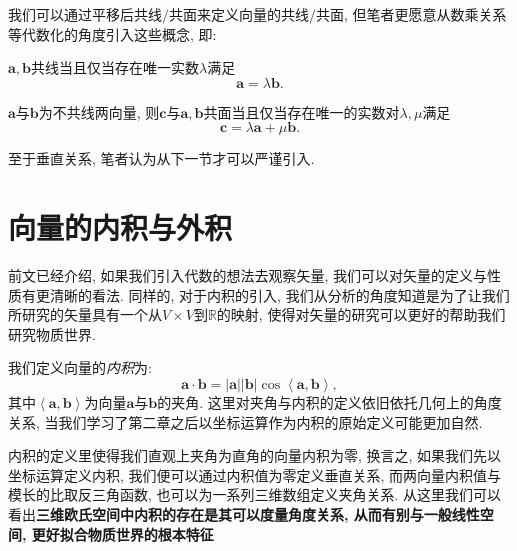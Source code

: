 \documentclass[./main.tex]{subfiles}
\begin{document}
我们可以通过平移后共线/共面来定义向量的共线/共面, 但笔者更愿意从数乘关系等代数化的角度引入这些概念, 即: 
\begin{theorem}[共线定理]
    \(\mathbf{a}, \mathbf{b} \)共线当且仅当存在唯一实数\(\lambda\)满足
\[\mathbf{a} =\lambda \mathbf{b}.\]
\end{theorem}
\begin{theorem}[共面定理]
\(\mathbf{a}\)与\(\mathbf{b}\)为不共线两向量, 则\(\mathbf{c}\)与\(\mathbf{a}, \mathbf{b}\)共面当且仅当存在唯一的实数对\(\lambda ,\mu\)满足
\[\mathbf{c}=\lambda \mathbf{a} +\mu \mathbf{b}.\]
\end{theorem}
至于垂直关系, 笔者认为从下一节才可以严谨引入. 
\section{向量的内积与外积}
前文已经介绍, 如果我们引入代数的想法去观察矢量, 我们可以对矢量的定义与性质有更清晰的看法. 同样的, 对于内积的引入, 我们从分析的角度知道是为了让我们所研究的矢量具有一个从\(V\times V\)到\(\mathbb{R}\)的映射, 使得对矢量的研究可以更好的帮助我们研究物质世界. 

我们定义向量的\textit{内积}为:
\[\mathbf{a}\cdot\mathbf{b}=\left |\mathbf{a} \right | \left | \mathbf{b} \right | \cos  \left \langle \mathbf{a},\mathbf{b} \right \rangle,\]
其中\(\left \langle\mathbf{a},\mathbf{b} \right \rangle\)为向量\(\mathbf{a}\)与\(\mathbf{b}\)的夹角. 这里对夹角与内积的定义依旧依托几何上的角度关系, 当我们学习了第二章之后以坐标运算作为内积的原始定义可能更加自然. 

内积的定义里使得我们直观上夹角为直角的向量内积为零, 换言之, 如果我们先以坐标运算定义内积, 我们便可以通过内积值为零定义垂直关系, 而两向量内积值与模长的比取反三角函数, 也可以为一系列三维数组定义夹角关系. 从这里我们可以看出\textbf{三维欧氏空间中内积的存在是其可以度量角度关系, 从而有别与一般线性空间, 更好拟合物质世界的根本特征}
\end{document}
